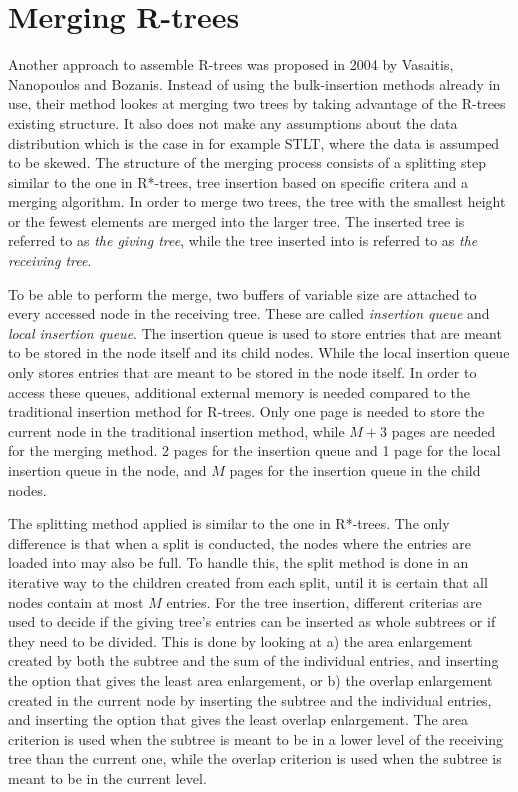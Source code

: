 \section{Merging R-trees}
Another approach to assemble R-trees was proposed in 2004 by Vasaitis, Nanopoulos and Bozanis\cite{MergingRtree}. Instead of using the bulk-insertion methods already in use, their method lookes at merging two trees by taking advantage of the R-trees existing structure. It also does not make any assumptions about the data distribution which is the case in for example STLT, where the data is assumped to be skewed\cite{STLT}. The structure of the merging process consists of a splitting step similar to the one in R*-trees, tree insertion based on specific critera and a merging algorithm. In order to merge two trees, the tree with the smallest height or the fewest elements are merged into the larger tree. The inserted tree is referred to as \emph{the giving tree}, while the tree inserted into is referred to as \emph{the receiving tree}. \newline

\noindent
To be able to perform the merge, two buffers of variable size are attached to every accessed node in the receiving tree. These are called \emph{insertion queue} and \emph{local insertion queue}. The insertion queue is used to store entries that are meant to be stored in the node itself and its child nodes. While the local insertion queue only stores entries that are meant to be stored in the node itself. In order to access these queues, additional external memory is needed compared to the traditional insertion method for R-trees. Only one page is needed to store the current node in the traditional insertion method, while $M+3$ pages are needed for the merging method. 2 pages for the insertion queue and 1 page for the local insertion queue in the node, and $M$ pages for the insertion queue in the child nodes.\newline

\noindent
The splitting method applied is similar to the one in R*-trees. The only difference is that when a split is conducted, the nodes where the entries are loaded into may also be full. To handle this, the split method is done in an iterative way to the children created from each split, until it is certain that all nodes contain at most $M$ entries. For the tree insertion, different criterias are used to decide if the giving tree's entries can be inserted as whole subtrees or if they need to be divided. This is done by looking at a) the area enlargement created by both the subtree and the sum of the individual entries, and inserting the option that gives the least area enlargement, or b) the overlap enlargement created in the current node by inserting the subtree and the individual entries, and inserting the option that gives the least overlap enlargement. The area criterion is used when the subtree is meant to be in a lower level of the receiving tree than the current one, while the overlap criterion is used when the subtree is meant to be in the current level.\newline

